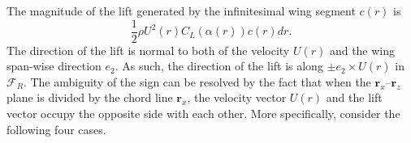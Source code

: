 \documentclass[10pt]{article}
\begin{document}
The magnitude of the lift generated by the infinitesimal wing segment $c(r)$ is
\[
    \frac{1}{2}\rho U^2(r) C_L(\alpha(r)) c(r) dr.
\]
The direction of the lift is normal to both of the velocity $U(r)$ and the wing span-wise direction $e_2$. 
As such, the direction of the lift is along $\pm e_2\times U(r)$ in $\mathcal{F}_R$. 
The ambiguity of the sign can be resolved by the fact that when the $\mathbf{r}_x$--$\mathbf{r}_z$ plane is divided by the chord line $\mathbf{r}_x$, the velocity vector $U(r)$ and the lift vector occupy the opposite side with each other. 
More specifically, consider the following four cases. 

\begin{figure}[h]
    \centerline{
        \footnotesize
        }
\end{figure}
\end{document}
